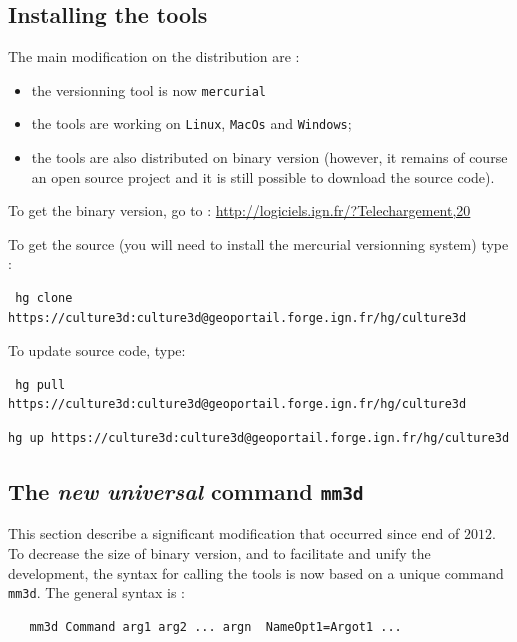 \subsection{Installing the tools}
\label{Install}

The main modification on the distribution are :

\begin{itemize}
   \item  the versionning tool is now {\tt mercurial}
   \item  the tools are working on {\tt Linux}, {\tt MacOs} and  {\tt Windows};
   \item  the tools are also distributed on binary version (however, it remains of course
	  an open source project and it is still possible to download the source code).
\end{itemize}

To get the binary version, go to : \url{http://logiciels.ign.fr/?Telechargement,20}


To get the source (you will need to install the mercurial versionning system) type :

\begin{verbatim}
 hg clone https://culture3d:culture3d@geoportail.forge.ign.fr/hg/culture3d
\end{verbatim}

To update source code, type:

\begin{verbatim}
 hg pull https://culture3d:culture3d@geoportail.forge.ign.fr/hg/culture3d
\end{verbatim}

\begin{verbatim}
hg up https://culture3d:culture3d@geoportail.forge.ign.fr/hg/culture3d
\end{verbatim}

\subsection{The \emph{new universal} command {\tt mm3d}}

This section describe a significant modification that occurred since end of $2012$. To decrease the
size of binary version, and to facilitate and unify the development, the syntax for calling the tools is now
based on a unique command {\tt mm3d}. The general syntax is :

\begin{verbatim}
   mm3d Command arg1 arg2 ... argn  NameOpt1=Argot1 ...
\end{verbatim}

